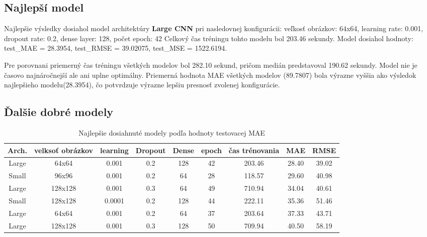 \subsection{Najlepší model}

Najlepšie výsledky dosiahol model architektúry \textbf{Large CNN} pri nasledovnej konfigurácii: veľkosť obrázkov: 64x64, learning rate: 0.001, dropout rate: 0.2,  dense layer: 128, počet epoch: 42 
Celkový čas tréningu tohto modelu bol 203.46 sekundy.  Model dosiahol hodnoty: test\_MAE = 28.3954, test\_RMSE = 39.02075, test\_MSE = 1522.6194.

Pre porovnani priemerný čas tréningu všetkých modelov bol 282.10 sekund, pričom medián predstavoval 190.62 sekundy. Model nie je časovo najnáročnejší ale ani uplne optimálny. Priemerná hodnota MAE všetkých modelov (89.7807) bola výrazne vyššia ako výsledok najlepšieho modelu(28.3954), čo potvrdzuje výrazne lepšiu presnosť zvolenej konfigurácie.

\subsection{Ďalšie dobré modely}
\begin{table}[H]
\centering
\caption{Najlepšie dosiahnuté modely podľa hodnoty testovacej MAE}
\label{tab:top_models}
\begin{tabular}{|c c c c c c c c c|}
\hline
Arch. & velksoť obrázkov & learning & Dropout & Dense & epoch & čas trénovania & MAE & RMSE \\ \hline

Large & 64x64 & 0.001 & 0.2 & 128 & 42 & 203.46 & 28.40 & 39.02 \\ \hline
Small & 96x96 & 0.001 & 0.2 & 64 & 28 & 118.57 & 29.60 & 40.98 \\ \hline
Large & 128x128 & 0.001 & 0.3 & 64 & 49 & 710.94 & 34.04 & 40.61 \\ \hline
Small & 128x128 & 0.0001 & 0.2 & 128 & 44 & 222.11 & 35.36 & 51.46 \\ \hline
Large & 64x64 & 0.001 & 0.2 & 64 & 37 & 203.64 & 37.33 & 43.71 \\ \hline
Large & 128x128 & 0.001 & 0.3 & 128 & 50 & 709.94 & 40.50 & 58.19 \\ \hline

\end{tabular}
\end{table}

